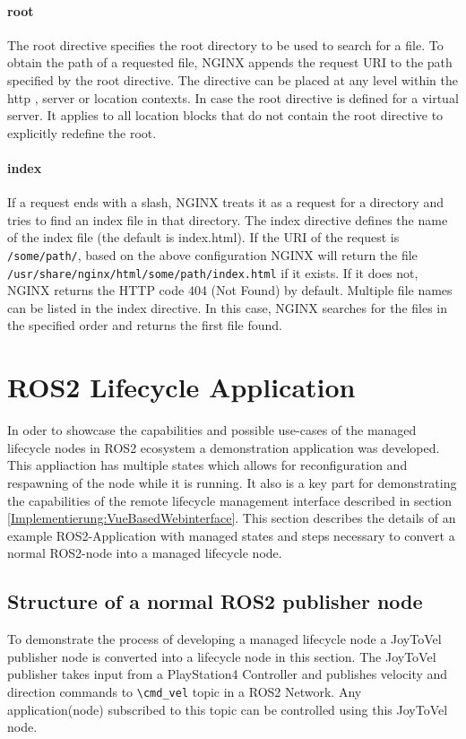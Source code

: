 \paragraph{root} The root directive specifies the root directory to be used to search for a file. To obtain the path of a requested file, NGINX appends the request URI to the path specified by the root directive. The directive can be placed at any level within the http {}, server {} or location {} contexts. In case the root directive is defined for a virtual server. It applies to all location {} blocks that do not contain the root directive to explicitly redefine the root.\cite{nginxCong}

\paragraph{index} If a request ends with a slash, NGINX treats it as a request for a directory and tries to find an index file in that directory. The index directive defines the name of the index file (the default is index.html). If the URI of the request is \lstinline{/some/path/}, based on the above configuration NGINX will return the file \lstinline{/usr/share/nginx/html/some/path/index.html} if it exists. If it does not, NGINX returns the HTTP code 404 (Not Found) by default. Multiple file names can be listed in the index directive. In this case, NGINX searches for the files in the specified order and returns the first file found.


\section{ROS2 Lifecycle Application}
\label{Implementierung:ROS2LifecycleApplication} 
In oder to showcase the capabilities and possible use-cases of the managed lifecycle nodes in ROS2 ecosystem a demonstration application was developed. This appliaction has multiple states which allows for reconfiguration and respawning of the node while it is running. It also is a key part for demonstrating the capabilities of the remote lifecycle management interface described in section \ref{Implementierung:VueBasedWebinterface}. This section describes the details of an example ROS2-Application with managed states and steps necessary to convert a normal ROS2-node into a managed lifecycle node. 

\subsection{Structure of a normal ROS2 publisher node}
To demonstrate the process of developing a managed lifecycle node a JoyToVel publisher node is converted into a lifecycle node in this section. The JoyToVel publisher takes input from a PlayStation4 Controller and publishes velocity and direction commands to \lstinline{\cmd_vel} topic in a ROS2 Network. Any application(node) subscribed to this topic can be controlled using this JoyToVel node.

